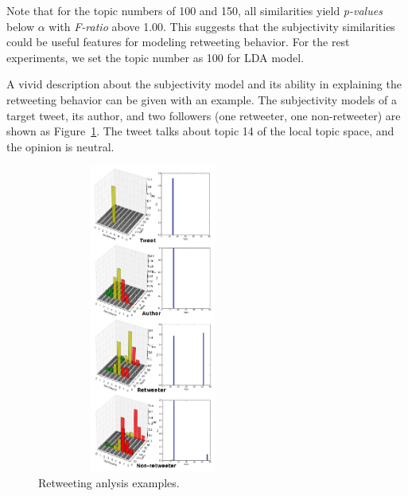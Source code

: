 \documentclass{acm_proc_article-sp}
\begin{document}
Note that for the topic numbers of 100 and 150, all similarities yield \textit{p-values} below $ \alpha $ with \textit{F-ratio} above 1.00. This suggests that the subjectivity similarities could be useful features for modeling retweeting behavior. 
For the rest experiments, we set the topic number as 100 for LDA model. 

A vivid description about the subjectivity model and its ability in explaining the retweeting behavior can be given with an example. 
The subjectivity models of a target tweet, its author, and two followers (one retweeter, one non-retweeter) are shown as Figure~\ref{fig2}. 
The tweet talks about topic 14 of the local topic space, and the opinion is neutral. 
\begin{figure}[t]
\centering%
\includegraphics[width=3.0in,height=4.0in]{example.pdf}
\caption{Retweeting anlysis examples.}
\label{fig2}
\end{figure}
\end{document}
